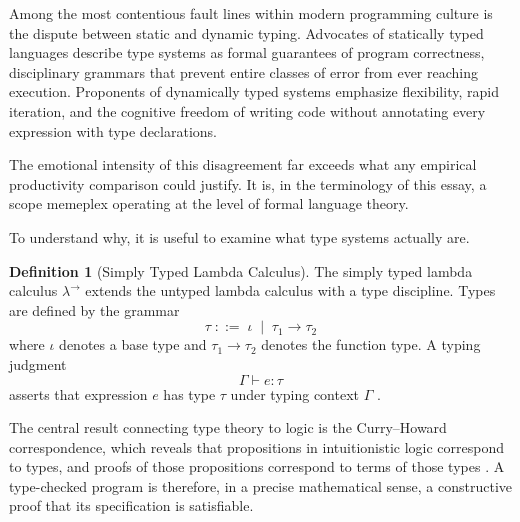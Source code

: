 \documentclass[11pt]{article}
\theoremstyle{definition}
\newtheorem{definition}{Definition}[section]
\begin{document}
Among the most contentious fault lines within modern programming culture
is the dispute between static and dynamic typing. Advocates of statically
typed languages describe type systems as formal guarantees of program
correctness, disciplinary grammars that prevent entire classes of error
from ever reaching execution. Proponents of dynamically typed systems
emphasize flexibility, rapid iteration, and the cognitive freedom of
writing code without annotating every expression with type declarations.

The emotional intensity of this disagreement far exceeds what any
empirical productivity comparison could justify. It is, in the
terminology of this essay, a scope memeplex operating at the level of
formal language theory.

To understand why, it is useful to examine what type systems actually are.

\begin{definition}[Simply Typed Lambda Calculus]
The simply typed lambda calculus $\lambda^\to$ extends the untyped
lambda calculus with a type discipline. Types are defined by the grammar
\[
\tau \;::=\; \iota \;\mid\; \tau_1 \to \tau_2
\]
where $\iota$ denotes a base type and $\tau_1 \to \tau_2$ denotes the
function type. A typing judgment
\[
\Gamma \vdash e : \tau
\]
asserts that expression $e$ has type $\tau$ under typing context
$\Gamma$ \cite{pierce2002,barendregt1984}.
\end{definition}

The central result connecting type theory to logic is the
Curry--Howard correspondence, which reveals that propositions in
intuitionistic logic correspond to types, and proofs of those
propositions correspond to terms of those types \cite{pierce2002}. A
type-checked program is therefore, in a precise mathematical sense, a
constructive proof that its specification is satisfiable.
\end{document}
